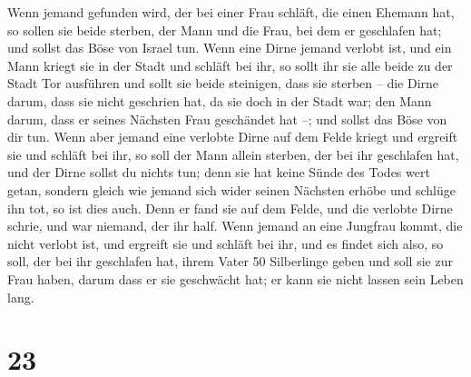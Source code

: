  Wenn jemand gefunden wird, der bei einer Frau schläft,
die einen Ehemann hat, so sollen sie beide sterben, der Mann und die
Frau, bei dem er geschlafen hat; und sollst das Böse von Israel tun.
 Wenn eine Dirne jemand verlobt ist, und ein Mann kriegt
sie in der Stadt und schläft bei ihr,  so sollt ihr sie
alle beide zu der Stadt Tor ausführen und sollt sie beide steinigen,
dass sie sterben -- die Dirne darum, dass sie nicht geschrien hat, da
sie doch in der Stadt war; den Mann darum, dass er seines Nächsten Frau
geschändet hat --; und sollst das Böse von dir tun.  Wenn
aber jemand eine verlobte Dirne auf dem Felde kriegt und ergreift sie
und schläft bei ihr, so soll der Mann allein sterben, der bei ihr
geschlafen hat,  und der Dirne sollst du nichts tun; denn
sie hat keine Sünde des Todes wert getan, sondern gleich wie jemand sich
wider seinen Nächsten erhöbe und schlüge ihn tot, so ist dies auch.
 Denn er fand sie auf dem Felde, und die verlobte Dirne
schrie, und war niemand, der ihr half.  Wenn jemand an
eine Jungfrau kommt, die nicht verlobt ist, und ergreift sie und schläft
bei ihr, und es findet sich also,  so soll, der bei ihr
geschlafen hat, ihrem Vater 50 Silberlinge geben und soll sie zur Frau
haben, darum dass er sie geschwächt hat; er kann sie nicht lassen sein
Leben lang.

\hypertarget{section-22}{%
\section{23}\label{section-22}}

